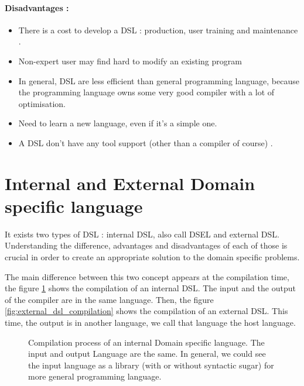 \paragraph{Disadvantages \cite{VanDeursen2000}:}
\begin{itemize}
\item There is a cost to develop a DSL : production, user training and
  maintenance .
\item Non-expert user may find hard to modify an existing program
\item In general, DSL are less efficient than general programming language,
  because the programming language owns some very good compiler with a lot of
  optimisation.
\item Need to learn a new language, even if it’s a simple one.
\item A DSL don’t have any tool support (other than a compiler of course) \cite{Mernik2005}.
\end{itemize}

\section{Internal and External Domain specific language}
\label{sec:internal_and_external_dsl}

It exists two types of \gls{DSL} : internal \gls{DSL}, also call \gls{DSEL} and
external DSL. Understanding the difference, advantages and disadvantages of each
of those is crucial in order to create an appropriate solution to the domain
specific problems.

The main difference between this two concept appears at the compilation time,
the figure \ref{fig:internal_dsl_compilation} shows the compilation of an
internal DSL. The input and the output of the compiler are in the same language.
Then, the figure \ref{fig:external_dsl_compilation} shows the compilation of an
external DSL. This time, the output is in another language, we call that
language the host language.

\begin{figure}[ht]
  \centering
  \caption[Compilation process of an internal \gls{DSL}]{Compilation process of
    an internal Domain specific language. The input and output Language are the
    same. In general, we could see the input language as a library (with or
    without syntactic sugar) for more general programming language.}
  \label{fig:internal_dsl_compilation}
\end{figure}

